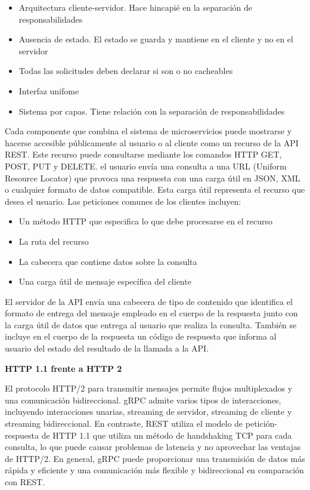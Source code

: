 \begin{itemize}
    \item Arquitectura cliente-servidor. Hace hincapié en la separación de responsabilidades
    \item Ausencia de estado. El estado se guarda y mantiene en el cliente y no en el servidor
    \item Todas las solicitudes deben declarar si son o no cacheables
    \item Interfaz unifome
    \item Sistema por capas. Tiene relación con la separación de responsabilidades
\end{itemize}

Cada componente que combina el sistema de microservicios puede mostrarse y hacerse accesible públicamente al usuario o al cliente como un recurso de la API REST. Este recurso puede consultarse mediante los comandos HTTP GET, POST, PUT y DELETE. el usuario envía una consulta a una URL (Uniform Resource Locator) que provoca una respuesta con una carga útil en JSON, XML o cualquier formato de datos compatible. Esta carga útil representa el recurso que desea el usuario. Las peticiones comunes de los clientes incluyen:

\begin{itemize}
    \item Un método HTTP que especifica lo que debe procesarse en el recurso
    \item La ruta del recurso
    \item La cabecera que contiene datos sobre la consulta
    \item Una carga útil de mensaje específica del cliente
\end{itemize}

El servidor de la API envía una cabecera de tipo de contenido que identifica el formato de entrega del mensaje empleado en el cuerpo de la respuesta junto con la carga útil de datos que entrega al usuario que realiza la consulta. También se incluye en el cuerpo de la respuesta un código de respuesta que informa al usuario del estado del resultado de la llamada a la API.

\textbf{HTTP 1.1 frente a HTTP 2}

El protocolo HTTP/2 para transmitir mensajes permite flujos multiplexados y una comunicación bidireccional. gRPC admite varios tipos de interacciones, incluyendo interacciones unarias, streaming de servidor, streaming de cliente y streaming bidireccional. En contraste, REST utiliza el modelo de petición-respuesta de HTTP 1.1 que utiliza un método de handshaking TCP para cada consulta, lo que puede causar problemas de latencia y no aprovechar las ventajas de HTTP/2. En general, gRPC puede proporcionar una transmisión de datos más rápida y eficiente y una comunicación más flexible y bidireccional en comparación con REST.

